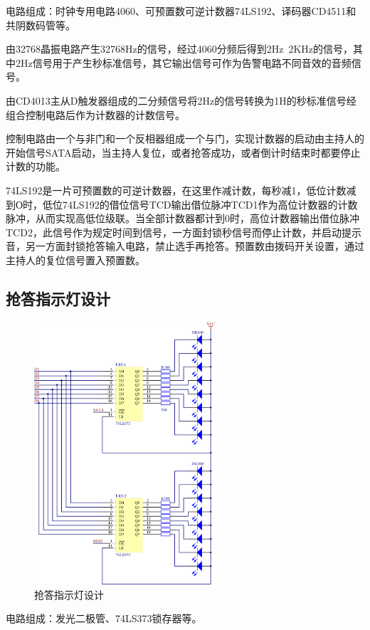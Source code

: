 \documentclass{../source/Experiment}
\begin{document}
            电路组成：时钟专用电路4060、可预置数可逆计数器74LS192、译码器CD4511和共阴数码管等。
            
            由32768晶振电路产生32768Hz的信号，经过4060分频后得到2Hz~2KHz的信号，其中2Hz信号用于产生秒标准信号，其它输出信号可作为告警电路不同音效的音频信号。
            
            由CD4013主从D触发器组成的二分频信号将2Hz的信号转换为1H的秒标准信号经组合控制电路后作为计数器的计数信号。

            控制电路由一个与非门和一个反相器组成一个与门，实现计数器的启动由主持人的开始信号SATA启动，当主持人复位，或者抢答成功，或者倒计时结束时都要停止计数的功能。

            74LS192是一片可预置数的可逆计数器，在这里作减计数，每秒减1，低位计数减到О时，低位74LS192的借位信号TCD输出借位脉冲TCD1作为高位计数器的计数脉冲，从而实现高低位级联。当全部计数器都计到0时，高位计数器输出借位脉冲TCD2，此信号作为规定时间到信号，一方面封锁秒信号而停止计数，并启动提示音，另一方面封锁抢答输入电路，禁止选手再抢答。预置数由拨码开关设置，通过主持人的复位信号置入预置数。

        \subsection{抢答指示灯设计} 
            \begin{figure}[H]
                \centering
                \includegraphics[width = 0.6\textwidth]{pic/P02.png}
                \caption{抢答指示灯设计}
            \end{figure}
            电路组成：发光二极管、74LS373锁存器等。
\end{document}
